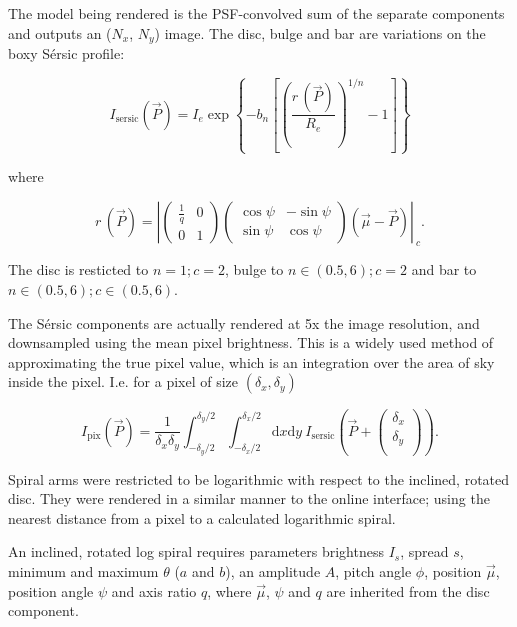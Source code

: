 \documentclass[../main.tex]{subfiles}
\begin{document}
The model being rendered is the PSF-convolved sum of the separate components and outputs an ($N_x$, $N_y$) image. The disc, bulge and bar are variations on the boxy S\'ersic profile:

\begin{equation}
I_\mathrm{sersic}(\vec{P}) = I_e \exp\left\{-b_n\left[\left(\frac{r\,(\vec{P})}{R_e}\right)^{1/n} - 1\right]\right\}
\end{equation}

where

\begin{equation}
r\,(\vec{P}) = \left|\begin{pmatrix}
\frac{1}{q} & 0 \\
0 & 1
\end{pmatrix}\begin{pmatrix}
\cos\psi & -\sin\psi\\
\sin\psi & \cos\psi
\end{pmatrix}\left(\vec\mu - \vec{P}\right)\right|_{\ c}.
\end{equation}

The disc is resticted to $n=1; c=2$, bulge to $n\in(0.5, 6); c=2$ and bar to $n\in(0.5, 6); c\in(0.5, 6)$.

The S\'ersic components are actually rendered at 5x the image resolution, and downsampled using the mean pixel brightness. This is a widely used method of approximating the true pixel value, which is an integration over the area of sky inside the pixel. I.e. for a pixel of size $(\delta_x, \delta_y)$

\begin{equation}
I_\mathrm{pix}(\vec{P}) = \frac{1}{\delta_x \delta_y}\int_{-\delta_y/2}^{\delta_y/2}\int_{-\delta_x/2}^{\delta_x/2}\mathrm{d}x\mathrm{d}y\ I_\mathrm{sersic}\left(\vec{P} + \begin{pmatrix}
\delta_x \\
\delta_y \\
\end{pmatrix}\right).
\end{equation}

Spiral arms were restricted to be logarithmic with respect to the inclined, rotated disc. They were rendered in a similar manner to the online interface; using the nearest distance from a pixel to a calculated logarithmic spiral.

An inclined, rotated log spiral requires parameters brightness $I_s$, spread $s$, minimum and maximum $\theta$ ($a$ and $b$), an amplitude $A$, pitch angle $\phi$, position $\vec\mu$, position angle $\psi$ and axis ratio $q$, where $\vec\mu$, $\psi$ and $q$ are inherited from the disc component.
\end{document}
